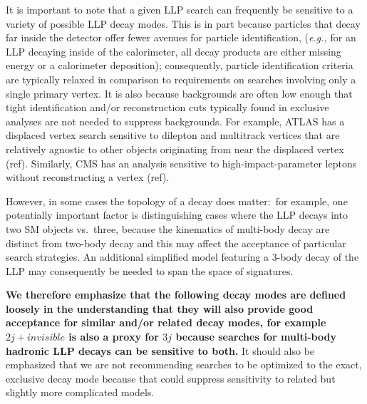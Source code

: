 It is important to note that a given LLP search can frequently be
sensitive to a variety of possible LLP decay modes.  This is in part
because particles that decay far inside the detector offer fewer
avenues for particle identification, (\emph{e.g.,} for an LLP decaying
inside of the calorimeter, all decay products are either missing
energy or a calorimeter deposition); consequently, particle identification
criteria are typically relaxed in comparison to requirements on searches involving
only a single primary vertex. It is also because backgrounds
are often low enough that tight identification and/or reconstruction
cuts typically found in exclusive analyses are not needed to suppress
backgrounds. For example, ATLAS has a displaced vertex search
sensitive to dilepton and multitrack vertices that are relatively
agnostic to other objects originating from near the displaced vertex
(ref). Similarly, CMS has an analysis sensitive to
high-impact-parameter leptons without reconstructing a vertex
(ref). 

However, in some cases the topology of a decay does matter:~for
example, one potentially important factor is distinguishing cases
where the LLP decays into two SM objects vs.~three, because the kinematics of multi-body
decay are distinct from two-body decay and this may affect the 
acceptance of particular search strategies.  An additional simplified model 
  featuring a 3-body decay of the LLP may consequently be needed to span
  the space of signatures.
  
{\bf We therefore emphasize that the following decay modes are defined
  loosely in the understanding that they will also provide good
  acceptance for similar and/or related decay modes, for example
  $2j+invisible$ is also a proxy for $3j$ because searches for
  multi-body hadronic LLP decays can be sensitive to both.} It
should also be emphasized that we are not recommending searches to be
optimized to the exact, exclusive decay mode because that could
suppress sensitivity to related but slightly more complicated models.


